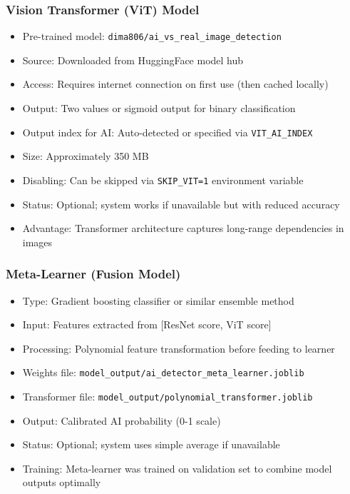 \documentclass[12pt,a4paper]{book}
\begin{document}
\subsubsection{Vision Transformer (ViT) Model}
\begin{itemize}
    \item Pre-trained model: \texttt{dima806/ai\_vs\_real\_image\_detection}
    \item Source: Downloaded from HuggingFace model hub
    \item Access: Requires internet connection on first use (then cached locally)
    \item Output: Two values or sigmoid output for binary classification
    \item Output index for AI: Auto-detected or specified via \texttt{VIT\_AI\_INDEX}
    \item Size: Approximately 350 MB
    \item Disabling: Can be skipped via \texttt{SKIP\_VIT=1} environment variable
    \item Status: Optional; system works if unavailable but with reduced accuracy
    \item Advantage: Transformer architecture captures long-range dependencies in images
\end{itemize}

\subsubsection{Meta-Learner (Fusion Model)}
\begin{itemize}
    \item Type: Gradient boosting classifier or similar ensemble method
    \item Input: Features extracted from [ResNet score, ViT score]
    \item Processing: Polynomial feature transformation before feeding to learner
    \item Weights file: \texttt{model\_output/ai\_detector\_meta\_learner.joblib}
    \item Transformer file: \texttt{model\_output/polynomial\_transformer.joblib}
    \item Output: Calibrated AI probability (0-1 scale)
    \item Status: Optional; system uses simple average if unavailable
    \item Training: Meta-learner was trained on validation set to combine model outputs optimally
\end{itemize}
\end{document}
